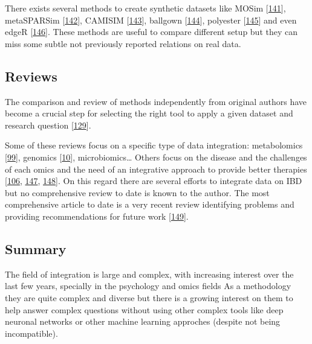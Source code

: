 \documentclass[
  a4paper,
]{book}
\begin{document}
There exists several methods to create synthetic datasets like MOSim {[}\protect\hyperlink{ref-haberman2019}{141}{]}, metaSPARSim {[}\protect\hyperlink{ref-patuzzi2019}{142}{]}, CAMISIM {[}\protect\hyperlink{ref-fritz2019}{143}{]}, ballgown {[}\protect\hyperlink{ref-fu2021}{144}{]}, polyester {[}\protect\hyperlink{ref-frazee2021}{145}{]} and even edgeR {[}\protect\hyperlink{ref-mccarthy2012}{146}{]}.
These methods are useful to compare different setup but they can miss some subtle not previously reported relations on real data.

\hypertarget{reviews}{%
\subsection{Reviews}\label{reviews}}

The comparison and review of methods independently from original authors have become a crucial step for selecting the right tool to apply a given dataset and research question {[}\protect\hyperlink{ref-cantini_benchmarking_2020}{129}{]}.

Some of these reviews focus on a specific type of data integration: metabolomics {[}\protect\hyperlink{ref-cavill2016}{99}{]}, genomics {[}\protect\hyperlink{ref-mcgovern2015}{10}{]}, microbiomics\ldots{} Others focus on the disease and the challenges of each omics and the need of an integrative approach to provide better therapies {[}\protect\hyperlink{ref-tarazona2021}{106}, \protect\hyperlink{ref-de_souza_ibd_2017}{147}, \protect\hyperlink{ref-valles-colomer2016}{148}{]}.
On this regard there are several efforts to integrate data on IBD but no comprehensive review to date is known to the author.
The most comprehensive article to date is a very recent review identifying problems and providing recommendations for future work {[}\protect\hyperlink{ref-sudhakar2022}{149}{]}.

\hypertarget{methods-integration}{%
\subsection{Summary}\label{methods-integration}}

The field of integration is large and complex, with increasing interest over the last few years, specially in the psychology and omics fields As a methodology they are quite complex and diverse but there is a growing interest on them to help answer complex questions without using other complex tools like deep neuronal networks or other machine learning approches (despite not being incompatible).
\end{document}
